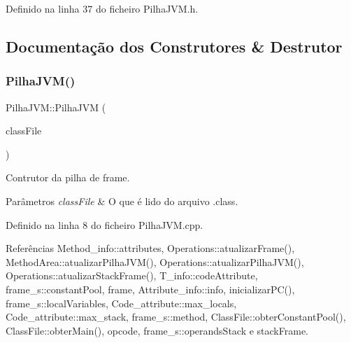 Definido na linha 37 do ficheiro Pilha\+J\+V\+M.\+h.



\subsection{Documentação dos Construtores \& Destrutor}
\mbox{\label{classPilhaJVM_a9acc6081073376a6f658c9dcfd3f6011}} 
\subsubsection{\texorpdfstring{Pilha\+J\+V\+M()}{PilhaJVM()}}
{\footnotesize\ttfamily Pilha\+J\+V\+M\+::\+Pilha\+J\+VM (\begin{DoxyParamCaption}\item[{\hyperlink{classClassFile}{Class\+File} $\ast$}]{class\+File }\end{DoxyParamCaption})}



Contrutor da pilha de frame. 


\begin{DoxyParams}{Parâmetros}
{\em class\+File} & O que é lido do arquivo .class. \\
\hline
\end{DoxyParams}


Definido na linha 8 do ficheiro Pilha\+J\+V\+M.\+cpp.



Referências Method\+\_\+info\+::attributes, Operations\+::atualizar\+Frame(), Method\+Area\+::atualizar\+Pilha\+J\+V\+M(), Operations\+::atualizar\+Pilha\+J\+V\+M(), Operations\+::atualizar\+Stack\+Frame(), T\+\_\+info\+::code\+Attribute, frame\+\_\+s\+::constant\+Pool, frame, Attribute\+\_\+info\+::info, inicializar\+P\+C(), frame\+\_\+s\+::local\+Variables, Code\+\_\+attribute\+::max\+\_\+locals, Code\+\_\+attribute\+::max\+\_\+stack, frame\+\_\+s\+::method, Class\+File\+::obter\+Constant\+Pool(), Class\+File\+::obter\+Main(), opcode, frame\+\_\+s\+::operands\+Stack e stack\+Frame.

